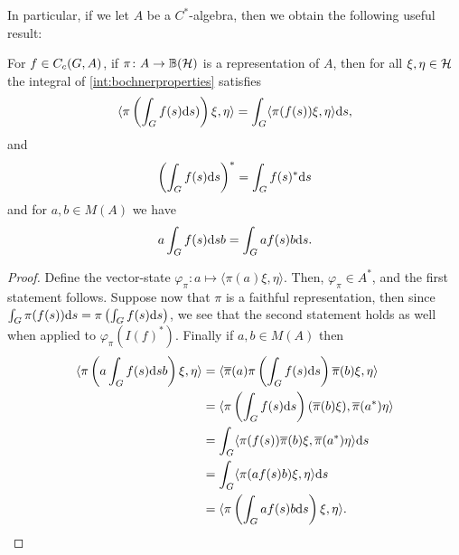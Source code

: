 In particular, if we let $A$ be a $C^*$-algebra, then we obtain the following useful result:
\begin{proposition}
	For $f \in C_c(G,A)$, if $\pi \colon A \to \mathbb{B}(\mathcal{H})$ is a representation of $A$, then for all $\xi , \eta \in \mathcal{H}$ the integral of \ref{int:bochnerproperties} satisfies
	\begin{align*}
		\langle \pi\left( \int_G f(s) \mathrm{d} s ) \right) \xi , \eta \rangle = \int_{G} \langle \pi(f(s)) \xi , \eta \rangle \mathrm{d} s,
	\end{align*}
	and 
	\begin{align*}
		\left( \int_G f(s) \mathrm{d} s  \right)^* = \int_G f(s)^* \mathrm{d} s
	\end{align*}
	and for $a , b \in M(A)$ we have
	\begin{align*}
	 a \int_G f(s) \mathrm{d} s b = \int_G a f(s) b \mathrm{d} s.		
	\end{align*}
	\label{int:cstarint}
\end{proposition}
\begin{proof}
	Define the vector-state $\varphi_\pi \colon a \mapsto \langle \pi(a) \xi , \eta \rangle$. Then, $\varphi_\pi \in A^*$, and the first statement follows. Suppose now that $\pi$ is a faithful representation, then since $\int_G \pi(f(s)) \mathrm{d} s = \pi \left( \int_Gf(s) \mathrm{d} s \right)$, we see that the second statement holds as well when applied to $\varphi_\pi(I(f)^*)$. Finally if $a,b \in M(A)$ then
	\begin{align*}
		\langle \pi\left(a \int_G f(s) \mathrm{d} s b \right) \xi , \eta \rangle &= \langle \overline \pi(a) \pi\left( \int_G f(s) \mathrm{d} s \right) \overline \pi (b)  \xi , \eta \rangle \\
		 &= \langle \pi \left( \int_G f(s) \mathrm{d} s \right) (\overline \pi (b) \xi ) , \overline \pi(a^*) \eta \rangle \\ 
		 &= \int_G \langle \pi(f(s)) \overline \pi (b) \xi , \overline \pi(a ^* ) \eta \rangle \mathrm{d} s\\
		 &= \int_G \langle \pi(af(s)b) \xi , \eta \rangle \mathrm{d} s\\
		 &= \langle \pi \left(  \int_G a f(s) b \mathrm{d} s  \right) \xi , \eta \rangle.
	\end{align*}
\end{proof}

